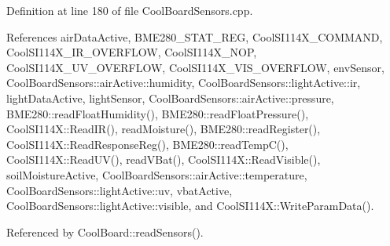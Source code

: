 Definition at line 180 of file Cool\+Board\+Sensors.\+cpp.



References air\+Data\+Active, B\+M\+E280\+\_\+\+S\+T\+A\+T\+\_\+\+R\+EG, Cool\+S\+I114\+X\+\_\+\+C\+O\+M\+M\+A\+ND, Cool\+S\+I114\+X\+\_\+\+I\+R\+\_\+\+O\+V\+E\+R\+F\+L\+OW, Cool\+S\+I114\+X\+\_\+\+N\+OP, Cool\+S\+I114\+X\+\_\+\+U\+V\+\_\+\+O\+V\+E\+R\+F\+L\+OW, Cool\+S\+I114\+X\+\_\+\+V\+I\+S\+\_\+\+O\+V\+E\+R\+F\+L\+OW, env\+Sensor, Cool\+Board\+Sensors\+::air\+Active\+::humidity, Cool\+Board\+Sensors\+::light\+Active\+::ir, light\+Data\+Active, light\+Sensor, Cool\+Board\+Sensors\+::air\+Active\+::pressure, B\+M\+E280\+::read\+Float\+Humidity(), B\+M\+E280\+::read\+Float\+Pressure(), Cool\+S\+I114\+X\+::\+Read\+I\+R(), read\+Moisture(), B\+M\+E280\+::read\+Register(), Cool\+S\+I114\+X\+::\+Read\+Response\+Reg(), B\+M\+E280\+::read\+Temp\+C(), Cool\+S\+I114\+X\+::\+Read\+U\+V(), read\+V\+Bat(), Cool\+S\+I114\+X\+::\+Read\+Visible(), soil\+Moisture\+Active, Cool\+Board\+Sensors\+::air\+Active\+::temperature, Cool\+Board\+Sensors\+::light\+Active\+::uv, vbat\+Active, Cool\+Board\+Sensors\+::light\+Active\+::visible, and Cool\+S\+I114\+X\+::\+Write\+Param\+Data().



Referenced by Cool\+Board\+::read\+Sensors().

